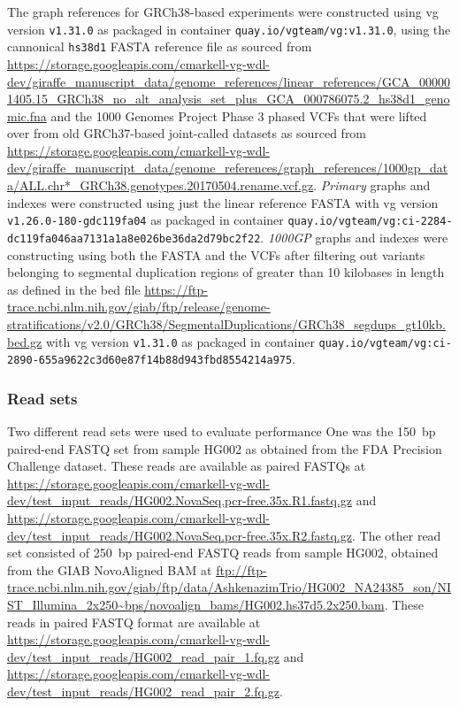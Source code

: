 \documentclass[11pt]{ucscthesis}
\newcommand{\vocab}[1]{\emph{#1}}
\begin{document}
The graph references for GRCh38-based experiments were constructed using vg version \texttt{v1.31.0} as packaged in container \texttt{quay.io/vgteam/vg:v1.31.0}, using the cannonical \texttt{hs38d1} FASTA reference file as sourced from \url{https://storage.googleapis.com/cmarkell-vg-wdl-dev/giraffe_manuscript_data/genome_references/linear_references/GCA_000001405.15_GRCh38_no_alt_analysis_set_plus_GCA_000786075.2_hs38d1_genomic.fna} and the 1000 Genomes Project Phase 3 phased VCFs that were lifted over from old GRCh37-based joint-called datasets as sourced from \url{https://storage.googleapis.com/cmarkell-vg-wdl-dev/giraffe_manuscript_data/genome_references/graph_references/1000gp_data/ALL.chr*_GRCh38.genotypes.20170504.rename.vcf.gz}.
\vocab{Primary} graphs and indexes were constructed using just the linear reference FASTA with vg version \texttt{v1.26.0-180-gdc119fa04} as packaged in container \texttt{quay.io/vgteam/vg:ci-2284-dc119fa046aa7131a1a8e026be36da2d79bc2f22}.
\vocab{1000GP} graphs and indexes were constructing using both the FASTA and the VCFs after filtering out variants belonging to segmental duplication regions of greater than 10 kilobases in length as defined in the bed file \url{https://ftp-trace.ncbi.nlm.nih.gov/giab/ftp/release/genome-stratifications/v2.0/GRCh38/SegmentalDuplications/GRCh38_segdups_gt10kb.bed.gz} with vg version \texttt{v1.31.0} as packaged in container \texttt{quay.io/vgteam/vg:ci-2890-655a9622c3d60e87f14b88d943fbd8554214a975}.

\subsubsection{Read sets}
Two different read sets were used to evaluate performance
One was the 150~bp paired-end FASTQ set from sample HG002 as obtained from the FDA Precision Challenge dataset.
These reads are available as paired FASTQs at \url{https://storage.googleapis.com/cmarkell-vg-wdl-dev/test_input_reads/HG002.NovaSeq.pcr-free.35x.R1.fastq.gz} and \url{https://storage.googleapis.com/cmarkell-vg-wdl-dev/test_input_reads/HG002.NovaSeq.pcr-free.35x.R2.fastq.gz}.
The other read set consisted of 250~bp paired-end FASTQ reads from sample HG002, obtained from the GIAB NovoAligned BAM at \url{ftp://ftp-trace.ncbi.nlm.nih.gov/giab/ftp/data/AshkenazimTrio/HG002_NA24385_son/NIST_Illumina_2x250~bps/novoalign_bams/HG002.hs37d5.2x250.bam}.
These reads in paired FASTQ format are available at \url{https://storage.googleapis.com/cmarkell-vg-wdl-dev/test_input_reads/HG002_read_pair_1.fq.gz} and \url{https://storage.googleapis.com/cmarkell-vg-wdl-dev/test_input_reads/HG002_read_pair_2.fq.gz}.
\end{document}
